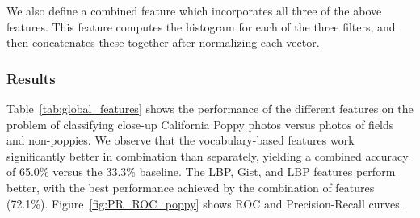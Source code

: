
We also define a combined feature which incorporates all three of the
above features. This feature computes the  histogram for
each of the three filters, and then concatenates these together after
normalizing  each vector.


%
%
%



\subsubsection*{Results}

Table~\ref{tab:global_features} shows the performance of the different 
features on the problem of classifying close-up California Poppy photos
versus photos of fields and non-poppies. We observe that the vocabulary-based
features work significantly better in combination than separately, yielding
a combined accuracy of 65.0\% versus the 33.3\% baseline. The LBP, Gist, and LBP features perform better, with the best performance achieved by the combination of features (72.1\%).
Figure~\ref{fig:PR_ROC_poppy}  shows ROC and Precision-Recall curves.



